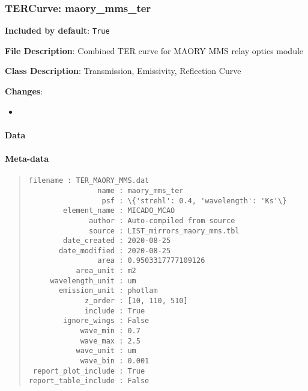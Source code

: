 \subsubsection{TERCurve: \textquotedbl{}maory\_mms\_ter\textquotedbl{}%
  \label{tercurve-maory-mms-ter}%
}

\textbf{Included by default}: \texttt{True}

\textbf{File Description}: Combined TER curve for MAORY MMS relay optics module

\textbf{Class Description}: Transmission, Emissivity, Reflection Curve

\textbf{Changes}:

\begin{itemize}
\item \end{itemize}


\paragraph{Data%
  \label{data}%
}

\begin{figure}[H]
\noindent{}\label{fig-maory-mms-ter}
\end{figure}


\paragraph{Meta-data%
  \label{meta-data}%
}

\begin{quote}
\begin{alltt}
\begin{lstlisting}[frame=single]
            filename : TER_MAORY_MMS.dat
                name : maory_mms_ter
                 psf : \{'strehl': 0.4, 'wavelength': 'Ks'\}
        element_name : MICADO_MCAO
              author : Auto-compiled from source
              source : LIST_mirrors_maory_mms.tbl
        date_created : 2020-08-25
       date_modified : 2020-08-25
                area : 0.9503317777109126
           area_unit : m2
     wavelength_unit : um
       emission_unit : photlam
             z_order : [10, 110, 510]
             include : True
        ignore_wings : False
            wave_min : 0.7
            wave_max : 2.5
           wave_unit : um
            wave_bin : 0.001
 report_plot_include : True
report_table_include : False
\end{lstlisting}
\end{alltt}
\end{quote}



